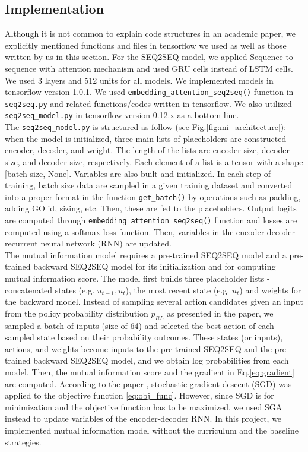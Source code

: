 \documentclass[letterpaper]{article}
\begin{document}
\subsection{Implementation}
Although it is not common to explain code structures in an academic paper, we explicitly mentioned functions and files in tensorflow we used as well as those written by us in this section.  
For the SEQ2SEQ model, we applied Sequence to sequence with attention mechanism and used GRU cells instead of LSTM cells. We used 3 layers and 512 units for all models. We implemented models in tensorflow version 1.0.1. We used \texttt{embedding\_attention\_seq2seq()} function in \texttt{seq2seq.py} and related functions/codes written in tensorflow. We also utilized \texttt{seq2seq\_model.py} in tensorflow version 0.12.x as a bottom line.\\
The \texttt{seq2seq\_model.py} is structured as follow (see Fig.\ref{fig:mi_architecture}): when the model is initialized, three main lists of placeholders are constructed - encoder, decoder, and weight. The length of the lists are encoder size, decoder size, and decoder size, respectively. Each element of a list is a tensor with a shape [batch size, None]. Variables are also built and initialized. In each step of training, batch size data are sampled in a given training dataset and converted into a proper format in the function \texttt{get\_batch()} by operations such as padding, adding GO id, sizing, etc. Then, these are fed to the placeholders. Output logits are computed through \texttt{embedding\_attention\_seq2seq()} function and losses are computed using a softmax loss function. Then, variables in the encoder-decoder recurrent neural network (RNN) are updated. \\
The mutual information model requires a pre-trained SEQ2SEQ model and a pre-trained backward SEQ2SEQ model for its initialization and for computing mutual information score. The model first builds three placeholder lists - concatenated states (e.g. $u_{t-1},u_t$), the most recent state (e.g. $u_t$) and weights for the backward model. Instead of sampling several action candidates given an input from the policy probability distribution $p_{RL}$ as presented in the paper, we sampled a batch of inputs (size of 64) and selected the best action of each sampled state based on their probability outcomes. These states (or inputs), actions, and weights become inputs to the pre-trained SEQ2SEQ and the pre-trained backward SEQ2SEQ model, and we obtain log probabilities from each model. Then, the mutual information score and the gradient in Eq.\ref{eq:gradient} are computed. According to the paper \cite{Li}, stochastic gradient descent (SGD) was applied to the objective function \ref{eq:obj_func}. However, since SGD is for minimization and the objective function has to be maximized, we used SGA instead to update variables of the encoder-decoder RNN. In this project, we implemented mutual information model without the curriculum and the baseline strategies.
\end{document}
